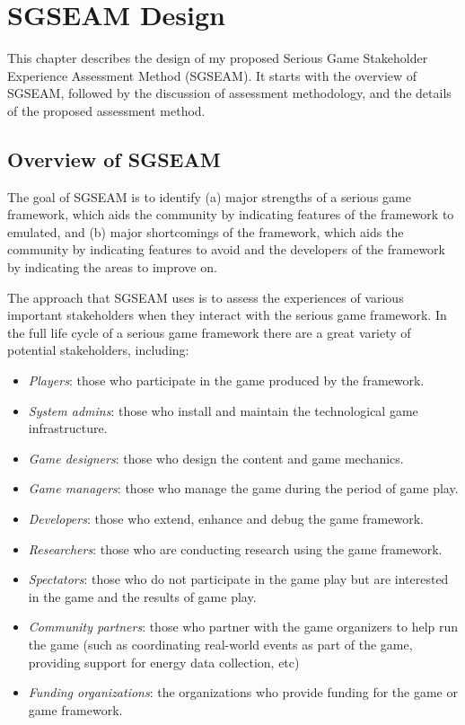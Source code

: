 \chapter{SGSEAM Design}
\label{cha:framework-description}
This chapter describes the design of my proposed Serious Game Stakeholder Experience 
Assessment Method (SGSEAM). It starts with the overview of SGSEAM, followed by the discussion of assessment methodology, and the details of the proposed assessment method.

\section{Overview of SGSEAM}

The goal of SGSEAM is to identify (a) major strengths of a serious game
framework, which aids the community by indicating features of the framework to emulated, and
(b) major shortcomings of the framework, which aids the community by indicating features to avoid
and the developers of the framework by indicating the areas to improve on.

The approach that SGSEAM uses is to assess the experiences of various important stakeholders when
they interact with the serious game framework. In the full life cycle of a serious game framework
there are a great variety of potential stakeholders, including:

\begin{itemize}
\item \emph{Players}: those who participate in the game produced by the framework.
\item \emph{System admins}: those who install and maintain the technological game infrastructure.
\item \emph{Game designers}: those who design the content and game mechanics.
\item \emph{Game managers}: those who manage the game during the period of game play.
\item \emph{Developers}: those who extend, enhance and debug the game framework.
\item \emph{Researchers}: those who are conducting research using the game framework.
\item \emph{Spectators}: those who do not participate in the game play
  but are interested in the game and the results of game play. 
\item \emph{Community partners}: those who partner with the game
  organizers to help run the game (such as coordinating real-world
  events as part of the game, providing support for energy data
  collection, etc) 
\item \emph{Funding organizations}: the organizations who provide
  funding for the game or game framework.
\end{itemize}

